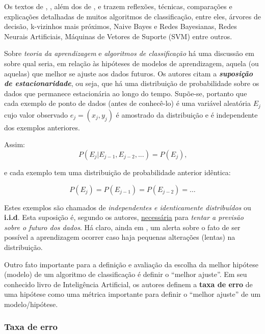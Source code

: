 Os textos de \cite{classification2013}, \cite{performance_classification2013},  além dos de \cite{Wolpert:1996}, \cite{classification_survey2012} e \cite{using_data_mining2012}  trazem reflexões, técnicas, comparações e explicações detalhadas de muitos algoritmos de classificação, entre eles, árvores de decisão, k-vizinhos mais próximos, Naive Bayes e Redes Bayesianas, Redes Neurais Artificiais, Máquinas de Vetores de Suporte (SVM) entre outros.   

Sobre \textit{teoria da aprendizagem} e \textit{algoritmos de classificação} há uma discussão em \cite{Norvig2013} sobre qual seria, em relação às hipóteses de modelos de aprendizagem, aquela (ou aquelas) que melhor se ajuste aos dados futuros. Os autores citam a \textbf{\textit{suposição de estacionaridade}}, ou seja, que há uma distribuição de probabilidade sobre os dados que permanece estacionária ao longo do tempo. Supõe-se, portanto que cada exemplo de ponto de dados (antes de conhecê-lo) é uma variável aleatória $E_j$ cujo valor observado $e_j = (x_j, y_j)$ é amostrado da distribuição e é independente dos exemplos anteriores. 

Assim:
\begin{equation}
	P (E_j|E_{j-1},E_{j-2}, ... ) = P(E_j) \textrm{,} 
\end{equation}

e cada exemplo tem uma distribuição de probabilidade anterior idêntica:

\begin{equation}
P(E_j) = P(E_{j-1}) = P(E_{j-2}) = \dots 
\end{equation}

Estes exemplos são chamados de \textit{independentes e identicamente distribuídos} ou \textbf{i.i.d}. Esta suposição é, segundo os autores, \underline{necessária} para \textit{tentar a previsão sobre o futuro dos dados}. Há claro, ainda em \cite{Norvig2013}, um alerta sobre o fato de ser possível a aprendizagem ocorrer caso haja pequenas alterações (lentas) na distribuição.

Outro fato importante para a definição e avaliação da escolha da melhor hipótese (modelo) de um algoritmo de classificação é definir o ``melhor ajuste''. Em seu conhecido livro de Inteligência Artificial, os autores \cite{Norvig2013} definem a \textbf{taxa de erro} de uma hipótese como uma métrica importante para definir o ``melhor ajuste'' de um modelo/hipótese.

\subsubsection{Taxa de erro}\label{taxa_erro}

